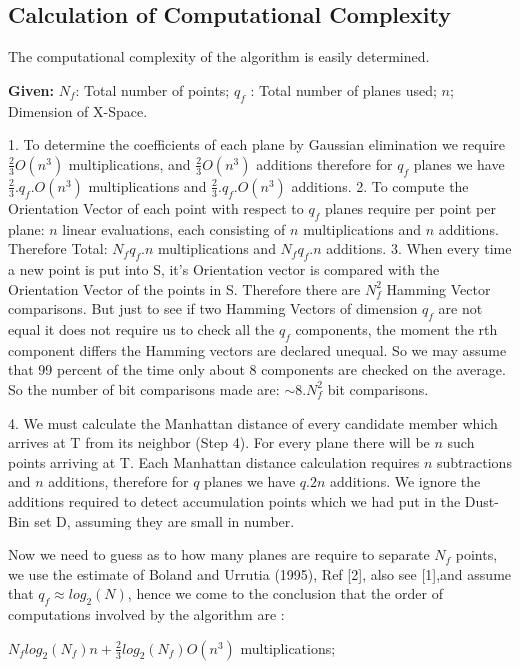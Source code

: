 \documentclass[english]{article}
\begin{document}
\subsection{Calculation of Computational Complexity}

The computational complexity of the algorithm is easily determined.

\textbf{Given:} $N_{f}$: Total number of points; $q_{f}$ : Total
number of planes used; $n$; Dimension of X-Space.

1. To determine the coefficients of each plane by Gaussian elimination
we require $\frac{2}{3}O(n^{3})$ multiplications, and $\frac{2}{3}O(n^{3})$
additions therefore for $q_{f}$ planes we have $\frac{2}{3}.q_{f}.O(n^{3})$
multiplications and $\frac{2}{3}.q_{f}.O(n^{3})$ additions. 2. To
compute the Orientation Vector of each point with respect to $q_{f}$
planes require per point per plane: $n$ linear evaluations, each
consisting of $n$ multiplications and $n$ additions. Therefore Total:
$N_{f}q_{f}.n$ multiplications and $N_{f}q_{f}.n$ additions. 3.
When every time a new point is put into S, it's Orientation vector
is compared with the Orientation Vector of the points in S. Therefore
there are $N_{f}^{2}$ Hamming Vector comparisons. But just to see
if two Hamming Vectors of dimension $q_{f}$ are not equal it does
not require us to check all the $q_{f}$ components, the moment the
rth component differs the Hamming vectors are declared unequal. So
we may assume that 99 percent of the time only about 8 components
are checked on the average. So the number of bit comparisons made
are: $\sim8.N_{f}^{2}$ bit comparisons.

4. We must calculate the Manhattan distance of every candidate member
which arrives at T from its neighbor (Step 4). For every plane there
will be $n$ such points arriving at T. Each Manhattan distance calculation
requires $n$ subtractions and $n$ additions, therefore for $q$
planes we have $q.2n$ additions. We ignore the additions required
to detect accumulation points which we had put in the Dust-Bin set
D, assuming they are small in number.

Now we need to guess as to how many planes are require to separate
$N_{f}$ points, we use the estimate of Boland and Urrutia (1995),
Ref {[}2{]}, also see {[}1{]},and assume that $q_{f}\approx log_{2}(N)$,
hence we come to the conclusion that the order of computations involved
by the algorithm are :

$N_{f}log_{2}(N_{f})n+\frac{2}{3}log_{2}(N_{f})O(n^{3})$ multiplications;
\end{document}
